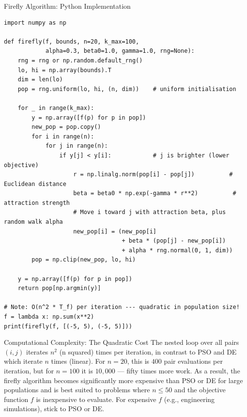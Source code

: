 \documentclass[aspectratio=169,10pt]{beamer}
\begin{document}
\begin{frame}[fragile]{Firefly Algorithm: Python Implementation}
\begin{lstlisting}[style=python, caption={Firefly Algorithm (Python / NumPy)}]
import numpy as np

def firefly(f, bounds, n=20, k_max=100,
            alpha=0.3, beta0=1.0, gamma=1.0, rng=None):
    rng = rng or np.random.default_rng()
    lo, hi = np.array(bounds).T
    dim = len(lo)
    pop = rng.uniform(lo, hi, (n, dim))    # uniform initialisation

    for _ in range(k_max):
        y = np.array([f(p) for p in pop])
        new_pop = pop.copy()
        for i in range(n):
            for j in range(n):
                if y[j] < y[i]:            # j is brighter (lower objective)
                    r = np.linalg.norm(pop[i] - pop[j])          # Euclidean distance
                    beta = beta0 * np.exp(-gamma * r**2)          # attraction strength
                    # Move i toward j with attraction beta, plus random walk alpha
                    new_pop[i] = (new_pop[i]
                                  + beta * (pop[j] - new_pop[i])
                                  + alpha * rng.normal(0, 1, dim))
        pop = np.clip(new_pop, lo, hi)

    y = np.array([f(p) for p in pop])
    return pop[np.argmin(y)]

# Note: O(n^2 * T_f) per iteration --- quadratic in population size!
f = lambda x: np.sum(x**2)
print(firefly(f, [(-5, 5), (-5, 5)]))
\end{lstlisting}

  \begin{block}{Computational Complexity: The Quadratic Cost}
    The nested loop over all pairs $(i, j)$ iterates $n^2$ (n
    squared) times per iteration, in contrast to PSO and DE which
    iterate $n$ times (linear).  For $n = 20$, this is $400$ pair
    evaluations per iteration, but for $n = 100$ it is $10{,}000$
    --- fifty times more work.  As a result, the firefly algorithm
    becomes significantly more expensive than PSO or DE for large
    populations and is best suited to problems where $n \leq 50$
    and the objective function $f$ is inexpensive to evaluate.
    For expensive $f$ (e.g., engineering simulations), stick to
    PSO or DE.
  \end{block}

\end{frame}

\end{document}
